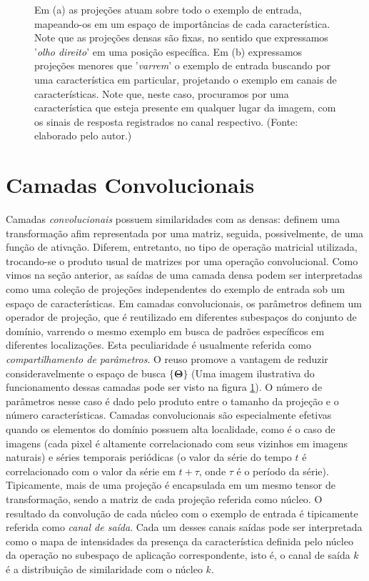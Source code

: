 \begin{figure}[ht!]
\begin{center}
\begin{subfigure}{0.6\textwidth}
		\caption{}
	\end{subfigure}
	\end{center}
	\small Em (a) as projeções atuam sobre todo o exemplo de entrada, mapeando-os em um espaço de importâncias de cada característica. Note que as projeções densas são fixas, no sentido que expressamos '\textit{olho direito}' em uma posição específica. Em (b) expressamos projeções menores que '\textit{varrem}' o exemplo de entrada buscando por uma característica em particular, projetando o exemplo em canais de características. Note que, neste caso, procuramos por uma característica que esteja presente em qualquer lugar da imagem, com os sinais de resposta registrados no canal respectivo. (Fonte: elaborado pelo autor.)
	\label{conv_lin}
\end{figure}

\section{Camadas Convolucionais}

Camadas \textit{convolucionais} \cite{LeCun1989, LeCun98} possuem similaridades com as densas: definem uma transformação afim representada por uma matriz, seguida, possivelmente, de uma função de ativação. Diferem, entretanto, no tipo de operação matricial utilizada, trocando-se o produto usual de matrizes por uma operação convolucional. Como vimos na seção anterior, as saídas de uma camada densa podem ser interpretadas como uma coleção de projeções independentes do exemplo de entrada sob um espaço de características. Em camadas convolucionais, os parâmetros definem um operador de projeção, que é reutilizado em diferentes subespaços do conjunto de domínio, varrendo o mesmo exemplo em busca de padrões específicos em diferentes localizações. Esta peculiaridade é usualmente referida como \textit{compartilhamento de parâmetros}. O reuso promove a vantagem de reduzir consideravelmente o espaço de busca $\{\mathbf{\Theta}\}$ (Uma imagem ilustrativa do funcionamento dessas camadas pode ser visto na figura \ref{conv_lin}). O número de parâmetros nesse caso é dado pelo produto entre o tamanho da projeção e o número características. Camadas convolucionais são especialmente efetivas quando os elementos do domínio possuem alta localidade, como é o caso de imagens (cada pixel é altamente correlacionado com seus vizinhos em imagens naturais) e séries temporais periódicas (o valor da série do tempo $t$ é correlacionado com o valor da série em $t + \tau$, onde $\tau$ é o período da série). Tipicamente, mais de uma projeção é encapsulada em um mesmo tensor de transformação, sendo a matriz de cada projeção referida como núcleo. O resultado da convolução de cada núcleo com o exemplo de entrada é tipicamente referida como \textit{canal de saída}. Cada um desses canais saídas pode ser interpretada como o mapa de intensidades da presença da característica definida pelo núcleo da operação no subespaço de aplicação correspondente, isto é, o canal de saída $k$ é a distribuição de similaridade com o núcleo $k$.



